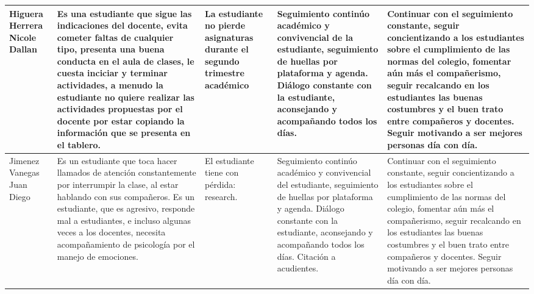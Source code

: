 \documentclass[spanish,11pt,a4paper]{article}
\begin{document}
\begin{longtable}{|p{3.5cm}|p{3.5cm}|p{3.5cm}|p{3.5cm}|p{3.5cm}|}
		Higuera Herrera Nicole Dallan & 
		Es una estudiante que sigue las indicaciones del docente, evita cometer faltas de cualquier tipo, presenta una buena conducta en el aula de clases, le cuesta inciciar y terminar actividades, a menudo la estudiante no quiere realizar las actividades propuestas por el docente por estar copiando la información que se presenta en el tablero. & 
		La estudiante no pierde asignaturas durante el segundo trimestre académico & 
		Seguimiento continúo académico y convivencial de la estudiante, seguimiento de huellas por plataforma y agenda. Diálogo constante con la estudiante, aconsejando y acompañando todos los días. & 
		Continuar con el seguimiento constante, seguir concientizando a los estudiantes sobre el cumplimiento de las normas del colegio, fomentar aún más el compañerismo, seguir recalcando en los estudiantes las buenas costumbres y el buen trato entre compañeros y docentes. Seguir motivando a ser mejores personas día con día.\\
		\hline
		
		Jimenez Vanegas Juan Diego & 
		Es un estudiante  que toca hacer llamados de atención constantemente por interrumpir la clase, al estar hablando con sus compañeros. Es un estudiante, que es agresivo, responde mal a estudiantes, e incluso algunas veces a los docentes, necesita acompañamiento de psicología por el manejo de emociones.& 
		El estudiante tiene con pérdida: research. & 
		Seguimiento continúo académico y convivencial del estudiante, seguimiento de huellas por plataforma y agenda. Diálogo constante con la estudiante, aconsejando y acompañando todos los días.  Citación a acudientes.& 
		Continuar con el seguimiento constante, seguir concientizando a los estudiantes sobre el cumplimiento de las normas del colegio, fomentar aún más el compañerismo, seguir recalcando en los estudiantes las buenas costumbres y el buen trato entre compañeros y docentes. Seguir motivando a ser mejores personas día con día.\\
		\hline
		

\end{longtable}
\end{document}
